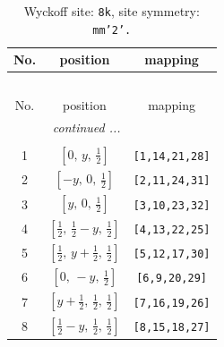 \documentclass[fleqn,8pt]{jsarticle}
\begin{document}
\begin{longtable}{ccc}
\caption{Wyckoff site: {\tt 8k}, site symmetry: {\tt mm'2'.}}
 \\
 \hline \hline
No. & position & mapping \\ \hline \endfirsthead

\multicolumn{2}{l}{\tablename\ \thetable{}} \\
 \hline \hline
No. & position & mapping \\ \hline \endhead

 \hline \hline
\multicolumn{2}{r}{\footnotesize\it continued ...} \\ \endfoot

 \hline \hline
\multicolumn{2}{r}{} \\ \endlastfoot

1 & $\left[ 0,\, y,\, \frac{1}{2} \right]$ & {\tt [1,14,21,28]} \\ \hline
2 & $\left[ - y,\, 0,\, \frac{1}{2} \right]$ & {\tt [2,11,24,31]} \\ \hline
3 & $\left[ y,\, 0,\, \frac{1}{2} \right]$ & {\tt [3,10,23,32]} \\ \hline
4 & $\left[ \frac{1}{2},\, \frac{1}{2} - y,\, \frac{1}{2} \right]$ & {\tt [4,13,22,25]} \\ \hline
5 & $\left[ \frac{1}{2},\, y + \frac{1}{2},\, \frac{1}{2} \right]$ & {\tt [5,12,17,30]} \\ \hline
6 & $\left[ 0,\, - y,\, \frac{1}{2} \right]$ & {\tt [6,9,20,29]} \\ \hline
7 & $\left[ y + \frac{1}{2},\, \frac{1}{2},\, \frac{1}{2} \right]$ & {\tt [7,16,19,26]} \\ \hline
8 & $\left[ \frac{1}{2} - y,\, \frac{1}{2},\, \frac{1}{2} \right]$ & {\tt [8,15,18,27]} \\
\end{longtable}
\renewcommand{\arraystretch}{1.2}
\end{document}
